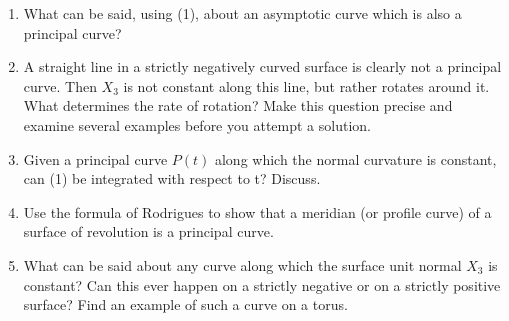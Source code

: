 \documentclass{book}
\begin{document}
\begin{enumerate}[1.]
\begin{equation}
      X_{3i} + k_{i} X_{i} = 0 \quad i=1,2
    \end{equation}
  where the subscript $i$ in $X_{3i}$ and $X_{i}$ denotes differentiation with respect to the surface coordinate $u_{i}$, and $k_{i}$ is the principal normal curvature of the $i$-th principal curve. Derive (3) from the Weingarten equations
    \begin{equation}
      X_{3i} = -L_{ij} g^{kj} X_{k} \quad i=1,2
    \end{equation}
  in which an index used both as a subscript and superscript implies summation from 1 to 2, and the $g^{kj}$ are the entries of the inverse matrix of the fundamental metric tensor whose entries are denoted $g_{kj}$. (The $g_{kj}$ are the coefficients $E$, $F$, and $G$ of the first fundamental form.) The $L_{ij}$ are the coefficients of the second fundamental form, and are often called $L$, $M$, and $N$. It may be useful to observe that the principal curves being parameter curves implies that on our surface
    \begin{equation}
      L_{12} = L_{21} = g_{12} = g_{21} = g^{12} = g^{21} = 0.
    \end{equation}
  As the fundamental metric tensor is a diagonal matrix by (5), it follows that $g^{ii} = \frac{1}{g_{ii}}$. Recall, also, that when the principal curves are parameter curves, $k_{i} = \frac{ L_{ii} }{ g_{ii} }$.
  \item What can be said, using (1), about an asymptotic curve which is also a principal curve?
  \item A straight line in a strictly negatively curved surface is clearly not a principal curve. Then $X_{3}$ is not constant along this line, but rather rotates around it. What determines the rate of rotation? Make this question precise and examine several examples before you attempt a solution.
  \item Given a principal curve $P(t)$ along which the normal curvature is constant, can (1) be integrated with respect to t? Discuss.
  \item Use the formula of Rodrigues to show that a meridian (or profile curve) of a surface of revolution is a principal curve.
  \item What can be said about any curve along which the surface unit normal $X_{3}$ is constant? Can this ever happen on a strictly negative or on a strictly positive surface? Find an example of such a curve on a torus.
\end{enumerate}
\end{document}
